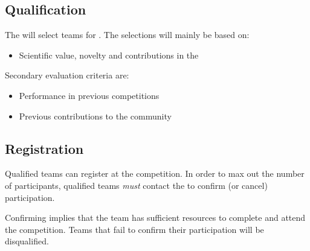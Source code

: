 
\subsection{Qualification}
\label{sec:rules:qualification}
The \OC{} will select teams for \Qualification{}. The selections will mainly be based on:
\begin{itemize}
	\item Scientific value, novelty and contributions in the \TDP{}

\end{itemize}
Secondary evaluation criteria are:
\begin{itemize}
	\item Performance in previous competitions
	\item Previous contributions to the \AtHome{} community
\end{itemize}


\subsection{Registration}
\label{sec:rules:registration}
Qualified teams can register at the \RoboCup\AtHome{} competition. In order to max out the number of participants, qualified teams \emph{must} contact the \OC{} to confirm (or cancel) participation.

Confirming implies that the team has sufficient resources to complete \Registration{} and attend the competition. Teams that fail to confirm their participation will be disqualified.

